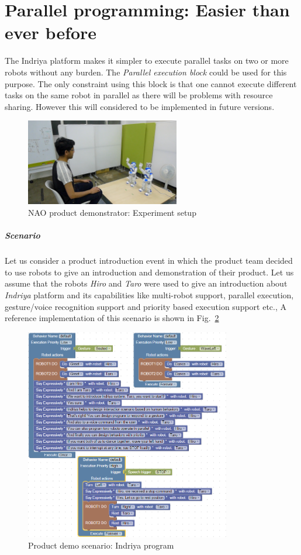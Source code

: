 \section{Parallel programming: Easier than ever before}
\label{sec:parallel_programming}
The Indriya platform makes it simpler to execute parallel tasks on two or more robots without any burden. The \emph{Parallel execution block} could be used for this purpose. The only constraint using this block is that one cannot execute different tasks on the same robot in parallel as there will be problems with resource sharing. However this will considered to be implemented in future versions.
\begin{figure}[H]
\centering
\includegraphics[width=0.6\textwidth]{../thesis/assets/indriya_intro_setup.png}
\caption[NAO product demonstrator: Experiment setup]{NAO product demonstrator: Experiment setup}
\label{fig:scenario3_setup}
\end{figure}
\subparagraph{Scenario}Let us consider a product introduction event in which the product team decided to use robots to give an introduction and demonstration of their product. Let us assume that the robots \emph{Hiro} and \emph{Taro} were used to give an introduction about \emph{Indriya} platform and its capabilities like multi-robot support, parallel execution, gesture/voice recognition support and priority based execution support etc., 
A reference implementation of this scenario is shown in Fig.~\ref{fig:complex_parallel_program}
\begin{figure}[H]
\centering
\includegraphics[width=0.8\textwidth]{../thesis/assets/indriya_intro.png}
\caption[Product demo scenario: Indriya program]{Product demo scenario: Indriya program}
\label{fig:complex_parallel_program}
\end{figure}
